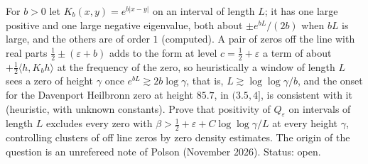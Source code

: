 \begin{problem}\label{dc:prob:visible}
For $b>0$ let $K_b(x,y)=e^{b|x-y|}$ on an interval of length $L$; it has one large positive and one large negative eigenvalue, both about $\pm e^{bL}/(2b)$ when $bL$ is large, and the others are of order $1$ (computed). A pair of zeros off the line with real parts $\frac12\pm(\varepsilon+b)$ adds to the form at level $c=\frac12+\varepsilon$ a term of about $+\frac12\langle h,K_bh\rangle$ at the frequency of the zero, so heuristically a window of length $L$ sees a zero of height $\gamma$ once $e^{bL}\gtrsim2b\log\gamma$, that is, $L\gtrsim\log\log\gamma/b$, and the onset for the Davenport Heilbronn zero at height $85.7$, in $(3.5,4]$, is consistent with it (heuristic, with unknown constants). Prove that positivity of $Q_\varepsilon$ on intervals of length $L$ excludes every zero with $\beta>\frac12+\varepsilon+C\log\log\gamma/L$ at every height $\gamma$, controlling clusters of off line zeros by zero density estimates. The origin of the question is an unrefereed note of Polson (November 2026). Status: open.
\end{problem}
